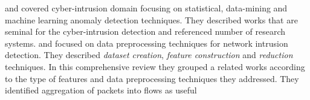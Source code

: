 %
 and  \cite{patcha2007anomaly} covered cyber-intrusion domain focusing on statistical,
data-mining and machine learning anomaly detection techniques. 
They described works that are seminal for the cyber-intrusion detection and referenced number of research systems.
%
%
 and  \cite{davis2011data} focused on data preprocessing techniques for network
intrusion detection. They described \emph{dataset creation}, \emph{feature construction} and \emph{reduction}
techniques. 
In this comprehensive review they grouped a related works according to the type of features and
data preprocessing techniques they addressed. They identified aggregation of packets into flows as useful
